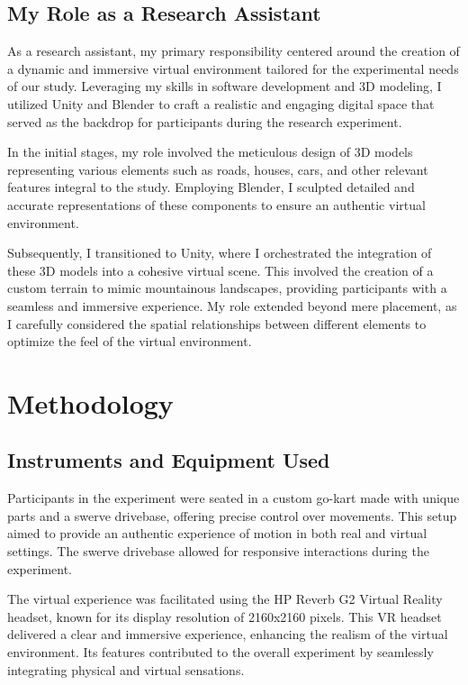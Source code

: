 \documentclass[a4paper, 12pt, oneside]{article}
\begin{document}
        \subsection{My Role as a Research Assistant}

        As a research assistant, my primary responsibility centered around the creation of a dynamic and immersive virtual 
        environment tailored for the experimental needs of our study. Leveraging my skills in software development and 3D modeling, 
        I utilized Unity and Blender to craft a realistic and engaging digital space that served as the backdrop for participants 
        during the research experiment.

        In the initial stages, my role involved the meticulous design of 3D models representing various elements such as roads, 
        houses, cars, and other relevant features integral to the study. Employing Blender, I sculpted detailed and accurate 
        representations of these components to ensure an authentic virtual environment.

        Subsequently, I transitioned to Unity, where I orchestrated the integration of these 3D models into a cohesive virtual scene.
        This involved the creation of a custom terrain to mimic mountainous landscapes, providing participants with a seamless and 
        immersive experience. My role extended beyond mere placement, as I carefully considered the spatial relationships between 
        different elements to optimize the feel of the virtual environment.
        \clearpage

    \section{Methodology}
        \subsection{Instruments and Equipment Used}
    
        Participants in the experiment were seated in a custom go-kart made with unique parts and a swerve drivebase, offering precise 
        control over movements. This setup aimed to provide an authentic experience of motion in both real and virtual settings. The 
        swerve drivebase allowed for responsive interactions during the experiment.

        The virtual experience was facilitated using the HP Reverb G2 Virtual Reality headset, known for its display resolution of 
        2160x2160 pixels. This VR headset delivered a clear and immersive experience, enhancing the realism of the virtual environment. 
        Its features contributed to the overall experiment by seamlessly integrating physical and virtual sensations.
\end{document}
